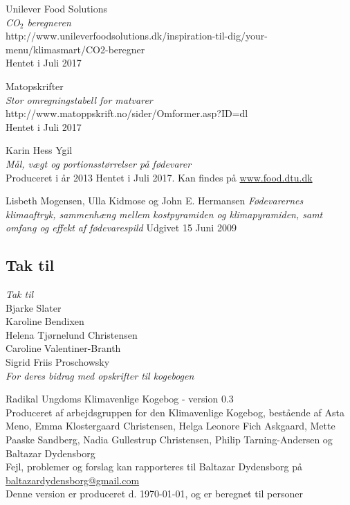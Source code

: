 \documentclass[11pt, a4paper]{article}
\newcommand{\coo}{CO$_2$ }
\begin{document}
\begin{thebibliography}{9}
	Unilever Food Solutions\\
	\textit{\coo beregneren}\\
	http://www.unileverfoodsolutions.dk/inspiration-til-dig/your-menu/klimasmart/CO2-beregner\\
	Hentet i Juli 2017
	
	Matopskrifter\\
	\textit{Stor omregningstabell for matvarer}\\
	http://www.matoppskrift.no/sider/Omformer.asp?ID=dl\\
	Hentet i Juli 2017
	
 Karin Hess Ygil\\
	\textit{Mål, vægt og portionsstørrelser på fødevarer}\\
	Produceret i år 2013
	Hentet i Juli 2017. Kan findes på \url{www.food.dtu.dk}
	
	Lisbeth Mogensen, Ulla Kidmose og John E. Hermansen
	\textit{Fødevarernes klimaaftryk,
		sammenhæng mellem kostpyramiden og klimapyramiden,
		samt omfang og effekt af fødevarespild}
	Udgivet 15 Juni 2009
	
\end{thebibliography}

\newpage

\begin{center}
	\section*{Tak til}
	\textit{Tak til}\\
	
	Bjarke Slater\\
	
	Karoline Bendixen\\
	
	Helena Tjørnelund Christensen\\
	
	Caroline Valentiner-Branth\\
	
	Sigrid Friis Proschowsky\\
	
	\textit{For deres bidrag med opskrifter til kogebogen}
\end{center}



	\newpage
	\centering Radikal Ungdoms Klimavenlige Kogebog - version 0.3\\
	Produceret af arbejdsgruppen for den Klimavenlige Kogebog, bestående af Asta Meno, Emma Klostergaard Christensen, Helga Leonore Fich Askgaard, Mette Paaske Sandberg, Nadia Gullestrup Christensen, Philip Tarning-Andersen og Baltazar Dydensborg\\
	Fejl, problemer og forslag kan rapporteres til Baltazar Dydensborg på \href{mailto:baltazardydensborg@gmail.com}{baltazardydensborg@gmail.com}\\
	Denne version er produceret d. \today, og er beregnet til \ruNumPersons{} personer
\end{document}
